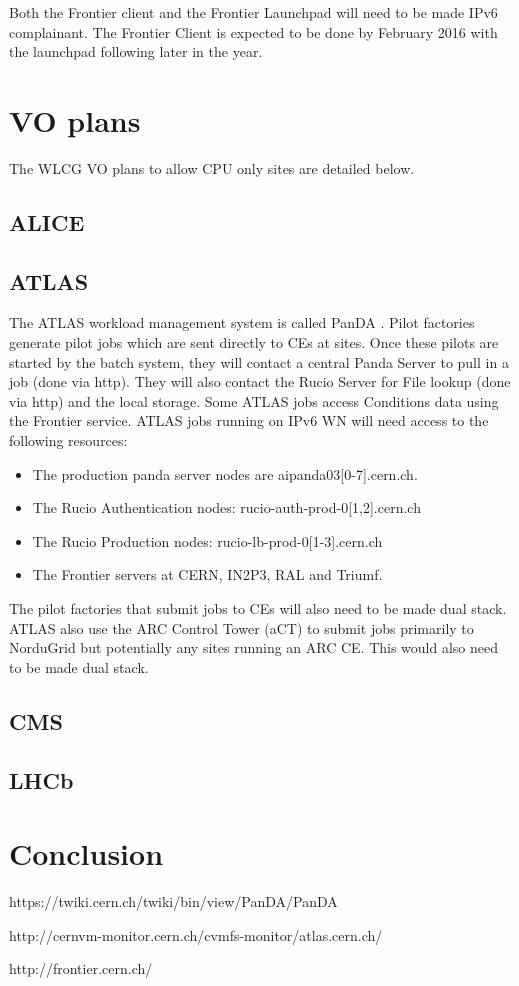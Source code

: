 Both the Frontier client and the Frontier Launchpad will need to be made IPv6 complainant.  The Frontier Client is expected to be done by February 2016 with the launchpad following later in the year.

\section{VO plans}
The WLCG VO plans to allow CPU only sites are detailed below.  

\subsection{ALICE}

\subsection{ATLAS}
The ATLAS workload management system is called PanDA \cite{Panda}.  Pilot factories generate pilot jobs which are sent directly to CEs at sites.  Once these pilots are started by the batch system, they will contact a central Panda Server to pull in a job (done via http).  They will also contact the Rucio Server for File lookup (done via http) and the local storage.  Some ATLAS jobs access Conditions data using the Frontier service. ATLAS jobs running on IPv6 WN will need access to the following resources:
\begin{itemize}
\item The production panda server nodes are aipanda03[0-7].cern.ch.

\item The Rucio Authentication nodes: rucio-auth-prod-0[1,2].cern.ch

\item The Rucio Production nodes: rucio-lb-prod-0[1-3].cern.ch

\item The Frontier servers at CERN, IN2P3, RAL and Triumf.

\end{itemize}  

The pilot factories that submit jobs to CEs will also need to be made dual stack.  ATLAS also use the ARC Control Tower (aCT) to submit jobs primarily to NorduGrid but potentially any sites running an ARC CE.  This would also need to be made dual stack.


\subsection{CMS}


\subsection{LHCb}


\section{Conclusion}


\begin{thebibliography}{99}

 https://twiki.cern.ch/twiki/bin/view/PanDA/PanDA

 http://cernvm-monitor.cern.ch/cvmfs-monitor/atlas.cern.ch/

 http://frontier.cern.ch/

\end{thebibliography}


